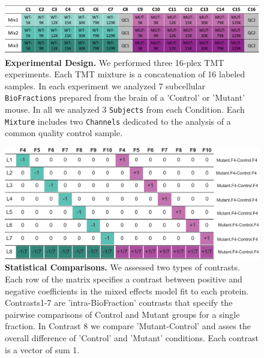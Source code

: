 \documentclass[11pt]{elife}\usepackage[]{graphicx}\usepackage[]{color}
\begin{document}

\begin{figure}[h]
  \begin{fullwidth}
  \begin{center}
	  \includegraphics[width=0.9\paperwidth,keepaspectratio]{design}
	  \caption{\textbf{Experimental Design.} We performed three 16-plex TMT
	  experiments. Each TMT mixture is a concatenation of 16 labeled
	  samples. In each experiment we analyzed 7 subcellular
	  \texttt{BioFractions} prepared from the brain of a 'Control' or
	  'Mutant' mouse. In all we analyzed 3 \texttt{Subjects} from each 
	  {Condition}. Each \texttt{Mixture} includes two \texttt{Channels}
	  dedicated to the analysis of a common quality control sample.}
	  \label{fig:design}
  \end{center}
  \end{fullwidth}
\end{figure}



\begin{figure}[h]
  \begin{fullwidth}
  \begin{center}
	  \includegraphics[width=0.9\paperwidth,keepaspectratio]{contrasts}
	  \caption{\textbf{Statistical Comparisons.} We assessed two types of
	  contrasts. Each row of the matrix specifies a contrast between
	  positive and negative coefficients in the mixed effects model fit to
	  each protein. Contrasts1-7 are 'intra-BioFraction' contrasts that
	  specify the pairwise comparisons of Control and Mutant groups for a
	  single fraction. In Contrast 8 we compare 'Mutant-Control' and asses
	  the overall difference of 'Control' and 'Mutant' conditions.  Each
	  contrast is a vector of sum 1.}
	  \label{fig:contrasts}
  \end{center}
  \end{fullwidth}
\end{figure}
\end{document}
